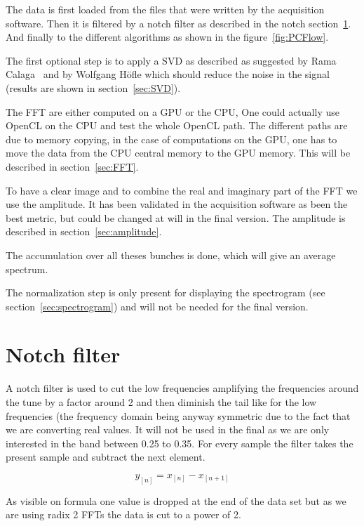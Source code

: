 The data is first loaded from the files that were written by the acquisition software. Then it is filtered by a notch filter as described in the notch section~\ref{sec:notch}. And finally to the different algorithms as shown in the figure~\ref{fig:PCFlow}.

The first optional step is to apply a \gls{SVD} as described as suggested by Rama Calaga~\cite{PhysRevSTAB.7.042801} and by Wolfgang H{\"o}f\/le\cite{HofleChamonix12} which should reduce the noise in the signal (results are shown in section~\ref{sec:SVD}).

The \gls{FFT} are either computed on a \gls{GPU} or the \gls{CPU}, One could actually use \gls{OpenCL} on the \gls{CPU} and test the whole \gls{OpenCL} path. The different paths are due to memory copying, in the case of computations on the \gls{GPU}, one has to move the data from the \gls{CPU} central memory to the \gls{GPU} memory. This will be described in section~\ref{sec:FFT}.

To have a clear image and to combine the real and imaginary part of the \gls{FFT} we use the amplitude. It has been validated in the acquisition software as been the best metric, but could be changed at will in the final version. The amplitude is described in section~\ref{sec:amplitude}.

The accumulation over all theses bunches is done, which will give an average spectrum.

The normalization step is only present for displaying the spectrogram (see section~\ref{sec:spectrogram}) and will not be needed for the final version.

\section{Notch filter}
\label{sec:notch}

A notch filter is used to cut the low frequencies amplifying the frequencies around the tune by a factor around 2 and then diminish the tail like for the low frequencies (the frequency domain being anyway symmetric due to the fact that we are converting real values. It will not be used in the final as we are only interested in the band between 0.25 to 0.35. For every sample the filter takes the present sample and subtract the next element. 

$$y_{[n]} = x_{[n]} - x_{[n + 1]}$$

As visible on formula one value is dropped at the end of the data set but as we are using radix 2 \glspl{FFT} the data is cut to a power of 2.

